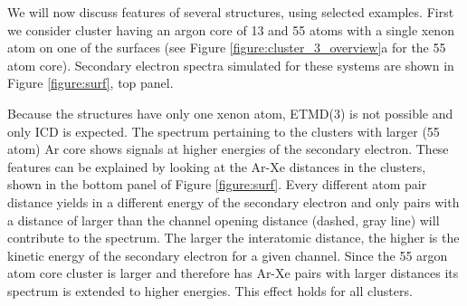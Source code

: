We will now discuss features of several structures, using selected examples.
First we consider cluster having an argon core of 13 and 55 atoms with a single xenon
atom on one of the surfaces (see Figure \ref{figure:cluster_3_overview}a
for the 55 atom core).
Secondary electron spectra simulated for these systems are shown in Figure \ref{figure:surf}, top panel.


Because the structures have only one xenon atom, ETMD(3) is not possible
and only ICD is expected. 
The spectrum pertaining to the clusters with larger (55 atom) Ar core shows
signals at higher energies of the secondary electron. These features
can be explained by looking at the Ar-Xe distances in the clusters, shown
in the bottom panel of Figure \ref{figure:surf}. 
Every different atom pair distance
yields in a different energy of the secondary electron and only pairs
with a distance of larger than the channel opening distance
(dashed, gray line) will contribute
to the spectrum. 
The larger the interatomic distance, the higher is the
kinetic energy of the secondary electron for a given channel.
Since the 55 argon atom core cluster is larger and therefore
has Ar-Xe pairs with larger distances its spectrum is extended to
higher energies.
This effect holds for all clusters.

